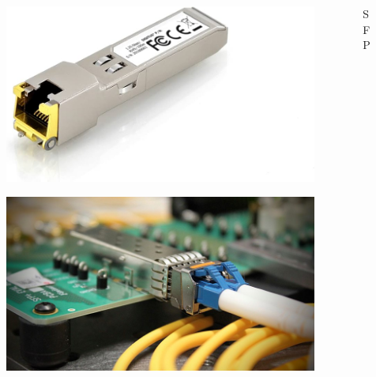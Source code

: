 \documentclass[
    ngerman,
    accentcolor=3b,
    fontsize= 12pt,
    a4paper,
    aspectratio=169,
    colorback=true,
    fancy_row_colors,
    leqno,
    fleqn,
    boxarc=3pt,
    fleqn,
    main,
    design=2008,
]{algoslides}
\begin{document}
    \begin{frame}
        \slidehead{}
        \vspace{-1em}
        \begin{columns}[c]
            \begin{column}{.5\textwidth}
                \begin{figure}[ht!]
                    \centering
                    \includegraphics[height=.3\textheight]{sfp-rj45}
                    \label{fig:sfp-rj45}

                    \vspace{1em}
                    \includegraphics[height=.3\textheight]{sfp-socket}
                    \label{fig:sfp-socket}
                \end{figure}
            \end{column}
            \pause
            \begin{column}{.5\textwidth}
                \large
                \centering
                SFP
            \end{column}
        \end{columns}
    \end{frame}
\end{document}
